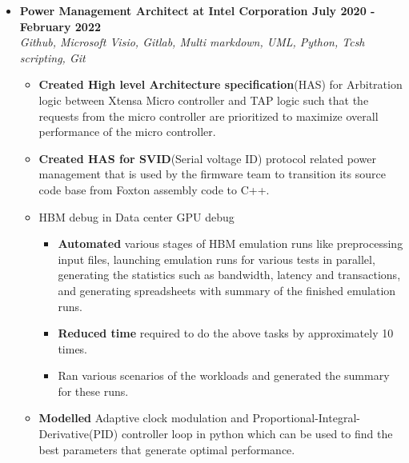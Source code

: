 \documentclass[a4paper,11pt]{article}
\newcommand{\isep}{-2 pt}
\newcommand{\spsep}{-0.75cm}
\begin{document}
\begin{itemize}
	\item \textbf{Power Management Architect at Intel Corporation \hfill July 2020 - February 2022} \\
	\emph{Github, Microsoft Visio, Gitlab,  \hfill Multi markdown, UML, Python, Tcsh scripting, Git} \\[\spsep]
		\begin{itemize} \itemsep \isep
			\item \textbf{Created High level Architecture specification}(HAS) for Arbitration logic between Xtensa Micro controller and TAP logic such that the requests from the micro controller are prioritized to maximize overall performance of the micro controller.
			\item \textbf{Created HAS for SVID}(Serial voltage ID) protocol related power management that is used by the firmware team to transition its source code base from Foxton assembly code to C++.
			\item HBM debug in Data center GPU debug
				\begin{itemize} \itemsep \isep
					\item \textbf{Automated} various stages of HBM emulation runs like preprocessing input files, launching emulation runs for various tests in parallel, generating the statistics such as bandwidth, latency and transactions, and generating spreadsheets with summary of the finished emulation runs.
					\item \textbf{Reduced time} required to do the above tasks by approximately 10 times.
					\item Ran various scenarios of the workloads and generated the summary for these runs.
				\end{itemize}
			\item \textbf{Modelled} Adaptive clock modulation and Proportional-Integral-Derivative(PID) controller loop in python which can be used to find the best parameters that generate optimal performance.
		\end{itemize}
	

\end{itemize}
\end{document}
